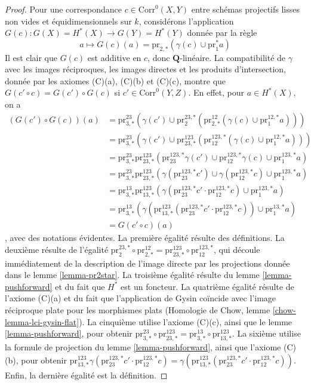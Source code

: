 \begin{proof}
\medskip\noindent
Pour une correspondance $c \in \text{Corr}^0(X, Y)$ entre
schémas projectifs lisses non vides et équidimensionnels sur $k$,
considérons l'application $G(c) : G(X) = H^*(X) \to G(Y) = H^*(Y)$
donnée par la règle
$$
a \longmapsto
G(c)(a) = \text{pr}_{2, *}(\gamma(c) \cup \text{pr}_1^*a)
$$
Il est clair que $G(c)$ est additive en $c$, donc $\mathbf{Q}$-linéaire.
La compatibilité de $\gamma$ avec les images réciproques, les images directes
et les produits d'intersection, donnée par les axiomes (C)(a), (C)(b) et (C)(c),
montre que
$G(c' \circ c) = G(c') \circ G(c)$ si $c' \in \text{Corr}^0(Y, Z)$.
En effet, pour $a \in H^*(X)$, on a
\begin{align*}
(G(c') \circ G(c))(a)
& =
\text{pr}^{23}_{3, *}(\gamma(c') \cup
\text{pr}^{23, *}_2(\text{pr}^{12}_{2, *}(\gamma(c) \cup
\text{pr}^{12, *}_1a))) \\
& =
\text{pr}^{23}_{3, *}(\gamma(c') \cup
\text{pr}^{123}_{23, *}(\text{pr}^{123, *}_{12}(\gamma(c) \cup
\text{pr}^{12, *}_1 a))) \\
& =
\text{pr}^{23}_{3, *}
\text{pr}^{123}_{23, *}(
\text{pr}^{123, *}_{23}\gamma(c') \cup
\text{pr}^{123, *}_{12}\gamma(c) \cup
\text{pr}^{123, *}_1 a) \\
& =
\text{pr}^{23}_{3, *}
\text{pr}^{123}_{23, *}(
\gamma(\text{pr}^{123, *}_{23}c') \cup
\gamma(\text{pr}^{123, *}_{12}c) \cup
\text{pr}^{123, *}_1 a) \\
& =
\text{pr}^{13}_{3, *}
\text{pr}^{123}_{13, *}(
\gamma(\text{pr}^{123, *}_{23}c' \cdot \text{pr}^{123, *}_{12}c) \cup
\text{pr}^{123, *}_1 a) \\
& =
\text{pr}^{13}_{3, *}(
\gamma(\text{pr}^{123}_{13, *}(\text{pr}^{123, *}_{23}c' \cdot
\text{pr}^{123, *}_{12}c)) \cup
\text{pr}^{13, *}_1 a) \\
& =
G(c' \circ c)(a)
\end{align*},
avec des notations évidentes. La première égalité résulte des définitions.
La deuxième résulte de l'égalité
$\text{pr}^{23, *}_2 \circ \text{pr}^{12}_{2, *} =
\text{pr}^{123}_{23, *} \circ \text{pr}^{123, *}_{12}$,
qui découle immédiatement de la description de l'image directe
par les projections donnée dans le lemme \ref{lemma-pr2star}.
La troisième égalité résulte du lemme \ref{lemma-pushforward}
et du fait que $H^*$ est un foncteur.
La quatrième égalité résulte de l'axiome (C)(a) et du fait que
l'application de Gysin coïncide avec l'image réciproque plate pour les morphismes plats
(Homologie de Chow, lemme \ref{chow-lemma-lci-gysin-flat}).
La cinquième utilise l'axiome (C)(c), ainsi que
le lemme \ref{lemma-pushforward}, pour obtenir
$\text{pr}^{23}_{3, *} \circ \text{pr}^{123}_{23, *} =
\text{pr}^{13}_{3, *} \circ \text{pr}^{123}_{13, *}$.
La sixième utilise la formule de projection du
lemme \ref{lemma-pushforward}, ainsi que
l'axiome (C)(b), pour obtenir $
\text{pr}^{123}_{13, *}
\gamma(\text{pr}^{123, *}_{23}c' \cdot \text{pr}^{123, *}_{12}c) =
\gamma(\text{pr}^{123}_{13, *}(
\text{pr}^{123, *}_{23}c' \cdot \text{pr}^{123, *}_{12}c))$.
Enfin, la dernière égalité est la définition.


\end{proof}

